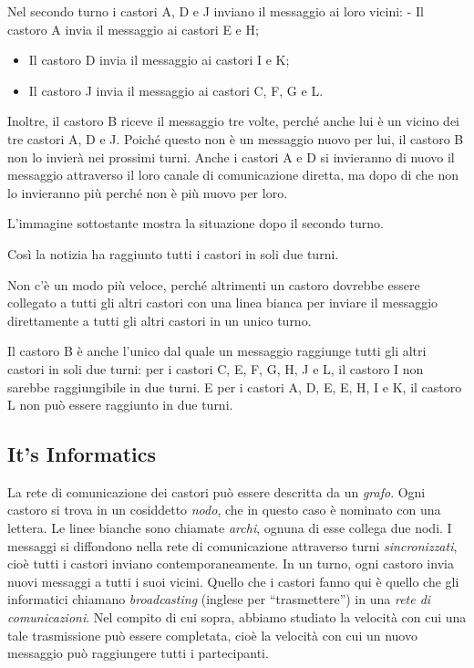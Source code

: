\documentclass[a4paper,11pt]{report}
\newcommand{\taskGraphicsFolder}{..}
\begin{document}
Nel secondo turno i castori A, D e J inviano il messaggio ai loro vicini: - Il castoro A invia il messaggio ai castori E e H;

\begin{itemize}
  \item Il castoro D invia il messaggio ai castori I e K;
  \item Il castoro J invia il messaggio ai castori C, F, G e L.
\end{itemize}

Inoltre, il castoro B riceve il messaggio tre volte, perché anche lui è un vicino dei tre castori A, D e J. Poiché questo non è un messaggio nuovo per lui, il castoro B non lo invierà nei prossimi turni. Anche i castori A e D si invieranno di nuovo il messaggio attraverso il loro canale di comunicazione diretta, ma dopo di che non lo invieranno più perché non è più nuovo per loro.

\begin{samepage}
L’immagine sottostante mostra la situazione dopo il secondo turno.

\nopagebreak

{\centering%
\par}
\end{samepage}

Così la notizia ha raggiunto tutti i castori in soli due turni.

Non c’è un modo più veloce, perché altrimenti un castoro dovrebbe essere collegato a tutti gli altri castori con una linea bianca per inviare il messaggio direttamente a tutti gli altri castori in un unico turno.

Il castoro B è anche l’unico dal quale un messaggio raggiunge tutti gli altri castori in soli due turni: per i castori C, E, F, G, H, J e L, il castoro I non sarebbe raggiungibile in due turni. E per i castori A, D, E, E, H, I e K, il castoro L non può essere raggiunto in due turni.


\subsection*{It’s Informatics}

La rete di comunicazione dei castori può essere descritta da un \emph{grafo}. Ogni castoro si trova in un cosiddetto \emph{nodo}, che in questo caso è nominato con una lettera. Le linee bianche sono chiamate \emph{archi}, ognuna di esse collega due nodi. I messaggi si diffondono nella rete di comunicazione attraverso turni \emph{sincronizzati}, cioè tutti i castori inviano contemporaneamente. In un turno, ogni castoro invia nuovi messaggi a tutti i suoi vicini. Quello che i castori fanno qui è quello che gli informatici chiamano \emph{broadcasting} (inglese per “trasmettere”)  in una \emph{rete di comunicazioni}. Nel compito di cui sopra, abbiamo studiato la velocità con cui una tale trasmissione può essere completata, cioè la velocità con cui un nuovo messaggio può raggiungere tutti i partecipanti.
\end{document}
